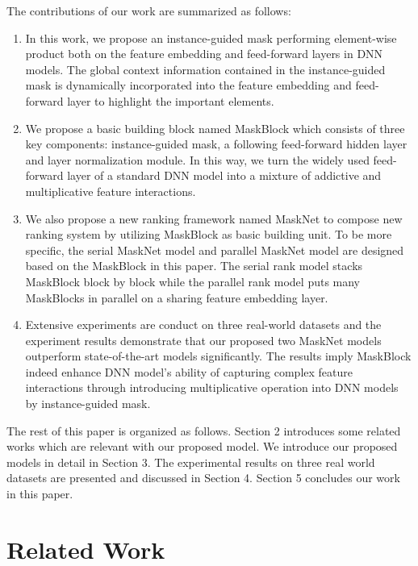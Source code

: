 \documentclass[sigconf]{acmart}
\begin{document}
The contributions of our work are summarized as follows:
\begin{enumerate}
    \item In this work, we  propose an instance-guided mask performing element-wise product both on the feature embedding and feed-forward layers in DNN models. The global context information contained in the instance-guided mask is dynamically incorporated into the feature embedding and feed-forward layer to highlight the important elements.

    \item We propose a  basic building block named MaskBlock which  consists of three key components: instance-guided mask, a  following feed-forward hidden layer and layer normalization module. In this way, we turn the widely used feed-forward layer of a standard DNN model into a mixture of addictive and multiplicative feature interactions.


    \item We also propose a new ranking framework named  MaskNet to compose new ranking system by utilizing MaskBlock as basic building unit. To be more specific, the serial MaskNet model and parallel MaskNet model are designed based on the MaskBlock in this paper. The serial rank model stacks MaskBlock block by block while the parallel rank model puts many MaskBlocks in parallel on a sharing feature embedding layer.


    \item Extensive experiments are conduct on three real-world datasets and the experiment results demonstrate that our proposed two MaskNet models outperform state-of-the-art models significantly. The results imply MaskBlock indeed  enhance DNN model’s  ability of capturing complex feature interactions through introducing multiplicative operation into DNN models by instance-guided mask.

\end{enumerate}


The rest of this paper is organized as follows. Section 2 introduces some related works which are relevant with our proposed model. We introduce our proposed models in detail in Section 3. The experimental results on three real world datasets are presented and discussed in Section 4. Section 5 concludes our work in this paper.




\section{Related Work}
\end{document}
